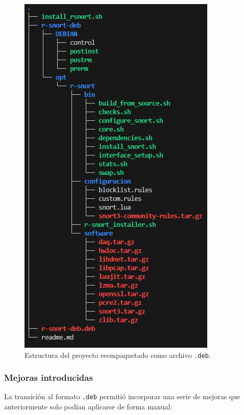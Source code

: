 \documentclass[11pt,a4paper,twoside]{report}
\begin{document}
\begin{figure}[H]
	\centering
	\includegraphics[scale=0.8]{script_automatico/13.png}
	\caption{Estructura del proyecto reempaquetado como archivo \texttt{.deb}.}
\end{figure}

\pagebreak

\subsubsection{Mejoras introducidas}

La transición al formato \texttt{.deb} permitió incorporar una serie de mejoras que anteriormente solo podían aplicarse de forma manual:
\end{document}
